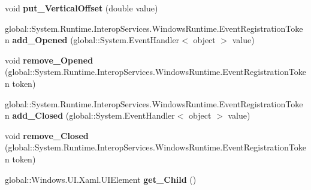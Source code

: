 \begin{DoxyCompactItemize}
\item 
\mbox{\label{interface_windows_1_1_u_i_1_1_xaml_1_1_controls_1_1_primitives_1_1_i_popup_a32f8e439f47db97069a953e214b6ca34}} 
void {\bfseries put\+\_\+\+Vertical\+Offset} (double value)
\item 
\mbox{\label{interface_windows_1_1_u_i_1_1_xaml_1_1_controls_1_1_primitives_1_1_i_popup_ab7ef34f049e0e256cb8967e69a9b98d7}} 
global\+::\+System.\+Runtime.\+Interop\+Services.\+Windows\+Runtime.\+Event\+Registration\+Token {\bfseries add\+\_\+\+Opened} (global\+::\+System.\+Event\+Handler$<$ object $>$ value)
\item 
\mbox{\label{interface_windows_1_1_u_i_1_1_xaml_1_1_controls_1_1_primitives_1_1_i_popup_a74799a81cbc767152e6840378638c41e}} 
void {\bfseries remove\+\_\+\+Opened} (global\+::\+System.\+Runtime.\+Interop\+Services.\+Windows\+Runtime.\+Event\+Registration\+Token token)
\item 
\mbox{\label{interface_windows_1_1_u_i_1_1_xaml_1_1_controls_1_1_primitives_1_1_i_popup_a9ad51ec03f9494cd9cd44d9aca1e407e}} 
global\+::\+System.\+Runtime.\+Interop\+Services.\+Windows\+Runtime.\+Event\+Registration\+Token {\bfseries add\+\_\+\+Closed} (global\+::\+System.\+Event\+Handler$<$ object $>$ value)
\item 
\mbox{\label{interface_windows_1_1_u_i_1_1_xaml_1_1_controls_1_1_primitives_1_1_i_popup_a737cc2cd2691f9cd97ecc0521717a7e8}} 
void {\bfseries remove\+\_\+\+Closed} (global\+::\+System.\+Runtime.\+Interop\+Services.\+Windows\+Runtime.\+Event\+Registration\+Token token)
\item 
\mbox{\label{interface_windows_1_1_u_i_1_1_xaml_1_1_controls_1_1_primitives_1_1_i_popup_a2a367d0d43b67f93a3e5d442297dcbd5}} 
global\+::\+Windows.\+U\+I.\+Xaml.\+U\+I\+Element {\bfseries get\+\_\+\+Child} ()
\item 

\end{DoxyCompactItemize}
